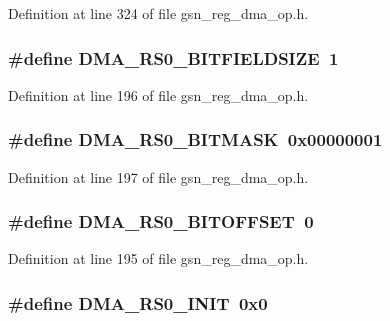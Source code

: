 Definition at line 324 of file gsn\_\-reg\_\-dma\_\-op.h.

\hypertarget{a00547_a530918fc7f88b1a6acbd32a5cbba4fd9}{
\subsubsection[{DMA\_\-RS0\_\-BITFIELDSIZE}]{\setlength{\rightskip}{0pt plus 5cm}\#define DMA\_\-RS0\_\-BITFIELDSIZE~1}}
\label{a00547_a530918fc7f88b1a6acbd32a5cbba4fd9}


Definition at line 196 of file gsn\_\-reg\_\-dma\_\-op.h.

\hypertarget{a00547_aa369513e546dacde1f08eb76869894c5}{
\subsubsection[{DMA\_\-RS0\_\-BITMASK}]{\setlength{\rightskip}{0pt plus 5cm}\#define DMA\_\-RS0\_\-BITMASK~0x00000001}}
\label{a00547_aa369513e546dacde1f08eb76869894c5}


Definition at line 197 of file gsn\_\-reg\_\-dma\_\-op.h.

\hypertarget{a00547_a04e836a71aa1a1b7c3d94d315cbec34b}{
\subsubsection[{DMA\_\-RS0\_\-BITOFFSET}]{\setlength{\rightskip}{0pt plus 5cm}\#define DMA\_\-RS0\_\-BITOFFSET~0}}
\label{a00547_a04e836a71aa1a1b7c3d94d315cbec34b}


Definition at line 195 of file gsn\_\-reg\_\-dma\_\-op.h.

\hypertarget{a00547_a29e2fa5db3db9c693c3ad57f77edd9f7}{
\subsubsection[{DMA\_\-RS0\_\-INIT}]{\setlength{\rightskip}{0pt plus 5cm}\#define DMA\_\-RS0\_\-INIT~0x0}}
\label{a00547_a29e2fa5db3db9c693c3ad57f77edd9f7}


